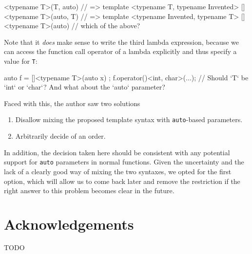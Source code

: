 \documentclass[11pt]{article}
\newcommand{\cc}[1]{\texttt{#1}}
\begin{document}
\begin{cpp}
[]<typename T>(T, auto) // => template <typename T, typename Invented>
[]<typename T>(auto, T) // => template <typename Invented, typename T>
[]<typename T>(auto)    // which of the above?
\end{cpp}

Note that it \textit{does} make sense to write the third lambda expression,
because we can access the function call operator of a lambda explicitly and
thus specify a value for \cc T:

\begin{cpp}
auto f = []<typename T>(auto x) { };
f.operator()<int, char>(...);
// Should `T` be `int` or `char`? And what about the `auto` parameter?
\end{cpp}

Faced with this, the author saw two solutions

\begin{enumerate}
  \item Disallow mixing the proposed template syntax with \cc{auto}-based parameters.
  \item Arbitrarily decide of an order.
\end{enumerate}

In addition, the decision taken here should be consistent with any potential
support for \cc{auto} parameters in normal functions. Given the uncertainty
and the lack of a clearly good way of mixing the two syntaxes, we opted for
the first option, which will allow us to come back later and remove the
restriction if the right answer to this problem becomes clear in the future.


\section{Acknowledgements}
TODO
\end{document}
